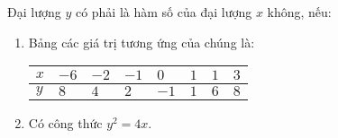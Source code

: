 \begin{vd}%
Đại lượng $y$ có phải là hàm số của đại lượng $x$ không, nếu:
\begin{enumerate}
\item Bảng các giá trị tương ứng của chúng là:
\begin{center}
\begin{tabular}{|>{\centering\arraybackslash}p{1.5cm}|>{\centering\arraybackslash}p{1cm}|>{\centering\arraybackslash}p{1cm}|>{\centering\arraybackslash}p{1cm}|>{\centering\arraybackslash}p{1cm}|>{\centering\arraybackslash}p{1cm}|>{\centering\arraybackslash}p{1cm}|>{\centering\arraybackslash}p{1cm}|}
\hline 
$x$ & $-6$ & $-2$ & $-1$ & $0$ & $1$ & $1$ & $3$ \\ 
\hline 
$y$ & $8$ & $4$ & $2$ & $-1$ & $1$ & $6$ & $8$ \\ 
\hline 
\end{tabular} 
\end{center}
\item Có công thức $y^2=4x$.
\end{enumerate}
\end{vd}
